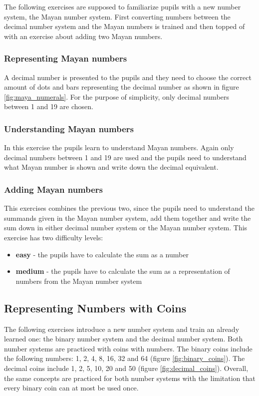 The following exercises are supposed to familiarize pupils with a new number system, the Mayan number system. First converting numbers between the decimal number system and the Mayan numbers is trained and then topped of with an exercise about adding two Mayan numbers.

\subsubsection*{Representing Mayan numbers}

A decimal number is presented to the pupils and they need to choose the correct amount of dots and bars representing the decimal number as shown in figure \ref{fig:maya_numerals}. For the purpose of simplicity, only decimal numbers between 1 and 19 are chosen.

\subsubsection*{Understanding Mayan numbers}

In this exercise the pupils learn to understand Mayan numbers. Again only decimal numbers between 1 and 19 are used and the pupils need to understand what Mayan number is shown and write down the decimal equivalent.

\subsubsection*{Adding Mayan numbers}

This exercises combines the previous two, since the pupils need to understand the summands given in the Mayan number system, add them together and write the sum down in either decimal number system or the Mayan number system. This exercise has two difficulty levels:

\begin{itemize}
  \item \textbf{easy} - the pupils have to calculate the sum as a number 
  \item \textbf{medium} - the pupils have to calculate the sum as a representation of numbers from the Mayan number system
\end{itemize}

\subsection*{Representing Numbers with Coins}

The following exercises introduce a new number system and train an already learned one: the binary number system and the decimal number system. Both number systems are practiced with coins with numbers. The binary coins include the following numbers: 1, 2, 4, 8, 16, 32 and 64 (figure \ref{fig:binary_coins}). The decimal coins include 1, 2, 5, 10, 20 and 50 (figure \ref{fig:decimal_coins}). 
Overall, the same concepts are practiced for both number systems with the limitation that every binary coin can at most be used once.

